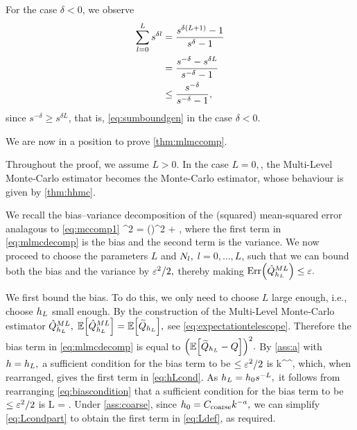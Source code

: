 For the case $\delta < 0$, we observe
\begin{align*}
\sum_{l=0}^L s^{\delta l} &= \frac{s^{\delta\mleft(L+1\mright)} -1}{s^{\delta}-1}\nonumber\\
&= \frac{s^{-\delta} - s^{\delta L}}{s^{-\delta}-1}\nonumber\\
&\leq \frac{s^{-\delta}}{s^{-\delta}-1},%
\end{align*}
since $s^{-\delta} \geq  s^{\delta L}$, that is, \cref{eq:sumboundgen} in the case $\delta < 0.$
\epf

We are now in a position to prove \cref{thm:mlmccomp}.

\label{page:mlmccompproof}
Throughout the proof, we assume $L>0.$ In the case $L=0,$, the Multi-Level Monte-Carlo estimator becomes the Monte-Carlo estimator, whose behaviour is given by \cref{thm:hhmc}.

We recall the bias--variance decomposition of the (squared) mean-squared error analagous to \cref{eq:mccomp1}
\beq\label{eq:mlmcdecomp}
\errQhatMLhL^2 = \mleft(\mright)^2 + \VAR{\QhatMLhL},
\eeq
where the first term in \cref{eq:mlmcdecomp} is the bias and the second term is the variance.
We now proceed to choose the parameters $L$ and $N_{l},$ $l = 0,\ldots,L$, such that we can bound both the bias and the variance by $\varepsilon^2/2,$ thereby making $\err{\QhatMLhL} \leq \eps.$

We first bound the bias. To do this, we only need to choose $L$ large enough, i.e., choose $h_{L}$ small enough. By the construction of the Multi-Level Monte-Carlo estimator $\hat{Q}^{ML}_{h_{L}},$ $\EXP{\QhatMLhL} = \EXP{\QhLtilde},$ see \cref{eq:expectationtelescope}. Therefore the bias term in \cref{eq:mlmcdecomp} is equal to $\mleft(\EXP{\QhLtilde - Q}\mright)^2.$ By \cref{ass:a} with $h=h_{L},$ a sufficient condition for the bias term to be $\leq \varepsilon^2/2$ is
\beq\label{eq:biascondition}
\co k^\sigma \hL^\alpha \leq {},
\eeq
which, when rearranged, gives the first term in \eqref{eq:hLcond}. As $h_{L} = h_{0} s^{-L},$ it follows from rearranging \cref{eq:biascondition} that a sufficient condition for the bias term to be $\leq \varepsilon^2/2$ is
\beq\label{eq:Lcondpart}
L = .
\eeq
Under \cref{ass:coarse}, since $h_{0} = C_{\mathrm{coarse}} k^{-a},$ we can simplify \eqref{eq:Lcondpart} to obtain the first term in \eqref{eq:Ldef}, as required.

